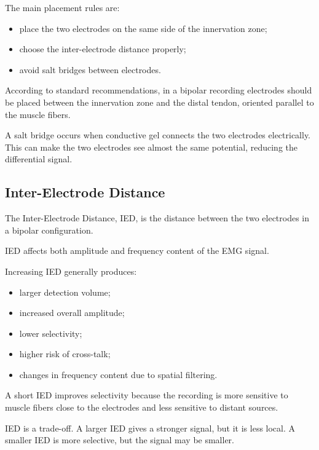 The main placement rules are:

\begin{itemize}[noitemsep]
    \item place the two electrodes on the same side of the innervation zone;
    \item choose the inter-electrode distance properly;
    \item avoid salt bridges between electrodes.
\end{itemize}

According to standard recommendations, in a bipolar recording electrodes should be placed between the innervation zone and the distal tendon, oriented parallel to the muscle fibers.

\begin{authornote}
A salt bridge occurs when conductive gel connects the two electrodes electrically. This can make the two electrodes see almost the same potential, reducing the differential signal.
\end{authornote}

\subsection{Inter-Electrode Distance}

The Inter-Electrode Distance, IED, is the distance between the two electrodes in a bipolar configuration.

IED affects both amplitude and frequency content of the EMG signal.

Increasing IED generally produces:

\begin{itemize}[noitemsep]
    \item larger detection volume;
    \item increased overall amplitude;
    \item lower selectivity;
    \item higher risk of cross-talk;
    \item changes in frequency content due to spatial filtering.
\end{itemize}

A short IED improves selectivity because the recording is more sensitive to muscle fibers close to the electrodes and less sensitive to distant sources.

\begin{authornote}
IED is a trade-off. A larger IED gives a stronger signal, but it is less local. A smaller IED is more selective, but the signal may be smaller.
\end{authornote}

